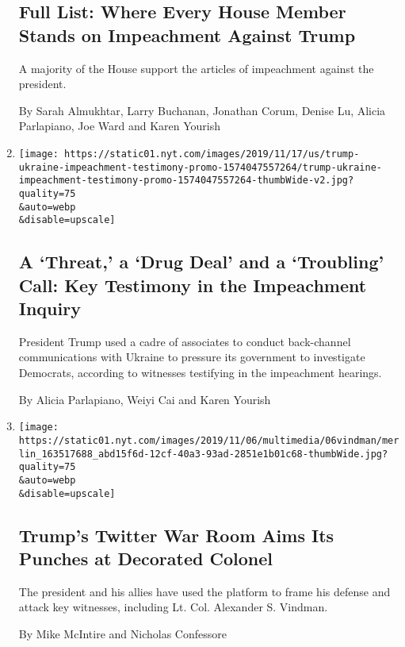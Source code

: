 \begin{enumerate}
  \hypertarget{full-list-where-every-house-member-stands-on-impeachment-against-trump}{%
  \subsection{Full List: Where Every House Member Stands on Impeachment
  Against
  Trump}\label{full-list-where-every-house-member-stands-on-impeachment-against-trump}}

  A majority of the House support the articles of impeachment against
  the president.

  By Sarah Almukhtar, Larry Buchanan, Jonathan Corum, Denise Lu, Alicia
  Parlapiano, Joe Ward and Karen Yourish
\item
  \href{/interactive/2019/11/18/us/politics/trump-ukraine-impeachment-testimony.html}{}

  \texttt{[image: https://static01.nyt.com/images/2019/11/17/us/trump-ukraine-impeachment-testimony-promo-1574047557264/trump-ukraine-impeachment-testimony-promo-1574047557264-thumbWide-v2.jpg?quality=75\\\&auto=webp\\\&disable=upscale]}

  \hypertarget{a-threat-a-drug-deal-and-a-troubling-call-key-testimony-in-the-impeachment-inquiry}{%
  \subsection{A `Threat,' a `Drug Deal' and a `Troubling' Call: Key
  Testimony in the Impeachment
  Inquiry}\label{a-threat-a-drug-deal-and-a-troubling-call-key-testimony-in-the-impeachment-inquiry}}

  President Trump used a cadre of associates to conduct back-channel
  communications with Ukraine to pressure its government to investigate
  Democrats, according to witnesses testifying in the impeachment
  hearings.

  By Alicia Parlapiano, Weiyi Cai and Karen Yourish
\item
  \href{/2019/11/06/us/politics/trump-vindman-twitter.html}{}

  \texttt{[image: https://static01.nyt.com/images/2019/11/06/multimedia/06vindman/merlin\_163517688\_abd15f6d-12cf-40a3-93ad-2851e1b01c68-thumbWide.jpg?quality=75\\\&auto=webp\\\&disable=upscale]}

  \hypertarget{trumps-twitter-war-room-aims-its-punches-at-decorated-colonel}{%
  \subsection{Trump's Twitter War Room Aims Its Punches at Decorated
  Colonel}\label{trumps-twitter-war-room-aims-its-punches-at-decorated-colonel}}

  The president and his allies have used the platform to frame his
  defense and attack key witnesses, including Lt. Col. Alexander S.
  Vindman.

  By Mike McIntire and Nicholas Confessore
\end{enumerate}

